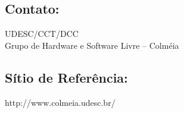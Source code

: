 \documentclass[final,a4paper]{article}
\begin{document}
\newpage
\subsection{Contato:}
UDESC/CCT/DCC \\
Grupo de Hardware e Software Livre -- Colméia\\

\subsection{Sítio de Referência:}

\textsf{http://www.colmeia.udesc.br/}
\end{document}
